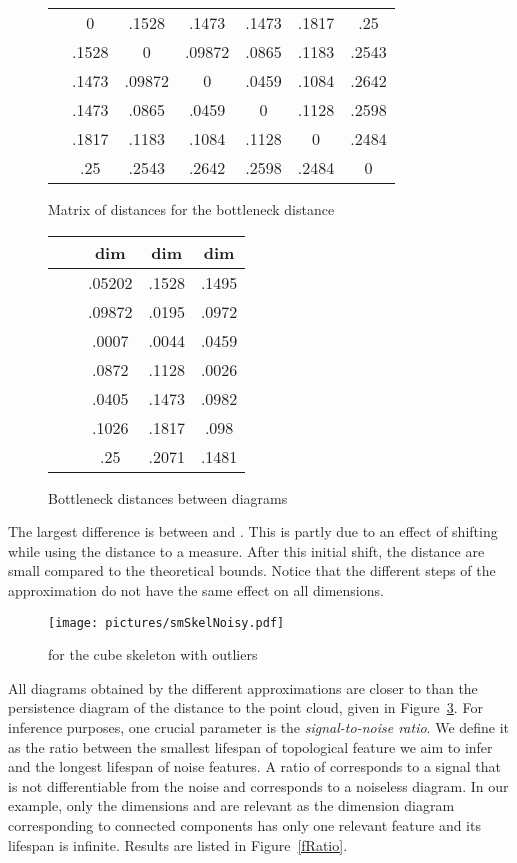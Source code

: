 \documentclass[a4paper]{article}
\begin{document}
\begin{figure}[!ht]
\centering
\begin{tabular}{|c|cccccc|}
\hline
&  &  &  &  &  &  \\
\hline
 & 0 & .1528 & .1473 & .1473 & .1817 & .25 \\
 & .1528 & 0 & .09872 & .0865 & .1183 & .2543 \\
 & .1473 & .09872 & 0 & .0459 & .1084 & .2642 \\ 
 & .1473 & .0865 & .0459 & 0 & .1128 & .2598 \\
 & .1817 & .1183 & .1084 & .1128 & 0 & .2484 \\
 & .25 & .2543 & .2642 & .2598 & .2484 & 0 \\
\hline
\end{tabular}
\caption{Matrix of distances for the bottleneck distance}\label{fMatrix}
\end{figure}


\begin{figure}[!ht]
\centering
\begin{tabular}{|c|c|c|c|c|}
\hline
 &  & dim  & dim  & dim  \\
\hline
 &  & .05202 & .1528 & .1495\\
 &  & .09872 & .0195 &  .0972\\
 &  & .0007 & .0044 & .0459 \\
 &  & .0872 & .1128 & .0026 \\
\hline
 &  & .0405 & .1473 & .0982 \\
 &  & .1026 & .1817 & .098 \\
 &  & .25 & .2071 & .1481 \\
\hline
\end{tabular}
\caption{Bottleneck distances between diagrams}\label{fBottle}
\end{figure}

The largest difference is between  and .
This is partly due to an effect of shifting while using the distance to a measure.
After this initial shift, the distance are small compared to the theoretical bounds. 
Notice that the different steps of the approximation do not have the same effect on all dimensions.

\begin{figure}[!ht]
\centering
\texttt{[image: pictures/smSkelNoisy.pdf]}
\caption{ for the cube skeleton with outliers}\label{fDiagDP}
\end{figure}

All diagrams obtained by the different approximations are closer to  than the persistence diagram of the distance to the point cloud,  given in Figure~\ref{fDiagDP}.
For inference purposes, one crucial parameter is the \emph{signal-to-noise ratio}.
We define it as the ratio between the smallest lifespan of topological feature we aim to infer and the longest lifespan of noise features.
A ratio of  corresponds to a signal that is not differentiable from the noise and  corresponds to a noiseless diagram.
In our example, only the dimensions  and  are relevant as the dimension  diagram corresponding to connected components has only one relevant feature and its lifespan is infinite.
Results are listed in Figure~\ref{fRatio}.
\end{document}
